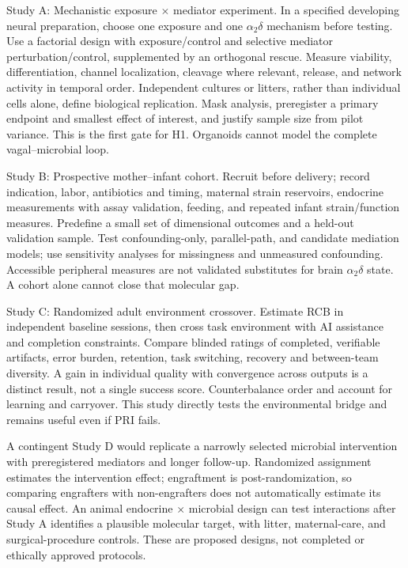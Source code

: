 Study A: Mechanistic exposure \ensuremath{\times} mediator experiment. In a specified developing neural preparation, choose one exposure and one \ensuremath{\alpha_2\delta} mechanism before testing. Use a factorial design with exposure/control and selective mediator perturbation/control, supplemented by an orthogonal rescue. Measure viability, differentiation, channel localization, cleavage where relevant, release, and network activity in temporal order. Independent cultures or litters, rather than individual cells alone, define biological replication. Mask analysis, preregister a primary endpoint and smallest effect of interest, and justify sample size from pilot variance. This is the first gate for H1. Organoids cannot model the complete vagal–microbial loop.

Study B: Prospective mother–infant cohort. Recruit before delivery; record indication, labor, antibiotics and timing, maternal strain reservoirs, endocrine measurements with assay validation, feeding, and repeated infant strain/function measures. Predefine a small set of dimensional outcomes and a held-out validation sample. Test confounding-only, parallel-path, and candidate mediation models; use sensitivity analyses for missingness and unmeasured confounding. Accessible peripheral measures are not validated substitutes for brain \ensuremath{\alpha_2\delta} state. A cohort alone cannot close that molecular gap.

Study C: Randomized adult environment crossover. Estimate RCB in independent baseline sessions, then cross task environment with AI assistance and completion constraints. Compare blinded ratings of completed, verifiable artifacts, error burden, retention, task switching, recovery and between-team diversity. A gain in individual quality with convergence across outputs is a distinct result, not a single success score. Counterbalance order and account for learning and carryover. This study directly tests the environmental bridge and remains useful even if PRI fails.

A contingent Study D would replicate a narrowly selected microbial intervention with preregistered mediators and longer follow-up. Randomized assignment estimates the intervention effect; engraftment is post-randomization, so comparing engrafters with non-engrafters does not automatically estimate its causal effect. An animal endocrine \ensuremath{\times} microbial design can test interactions after Study A identifies a plausible molecular target, with litter, maternal-care, and surgical-procedure controls. These are proposed designs, not completed or ethically approved protocols.


